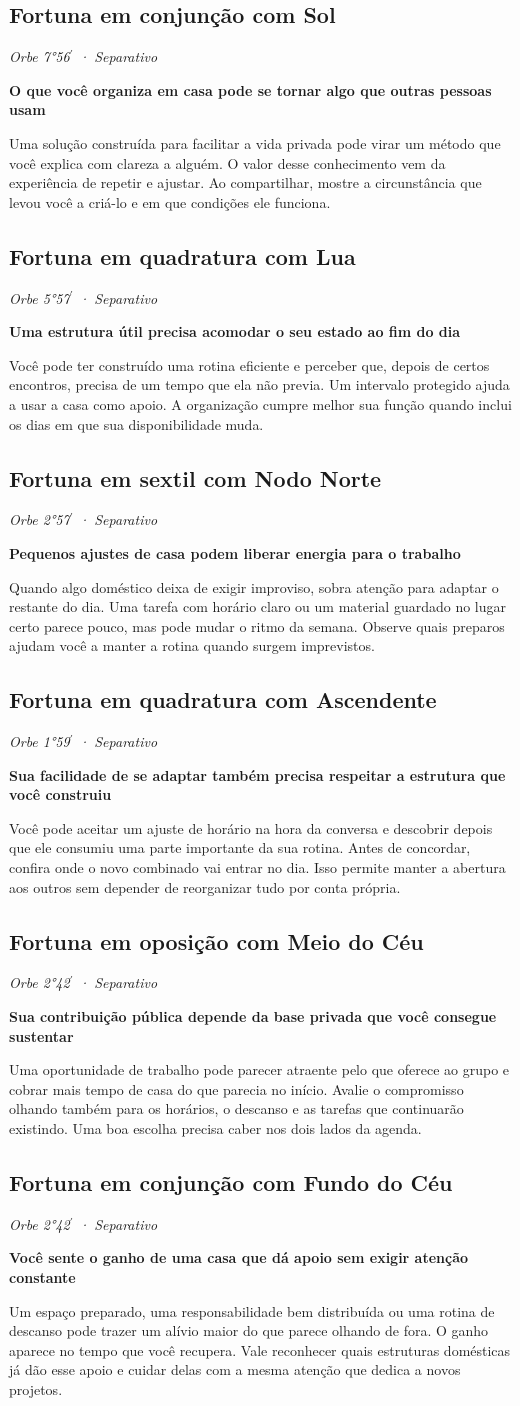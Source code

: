 \documentclass[11pt,a4paper]{article}
\newcommand{\leitura}[3]{\subsection{#1}\textit{#2}\par #3}
\newcommand{\subtituloleitura}[1]{\textbf{#1}\par\nopagebreak[4]}
\begin{document}
\leitura{Fortuna em conjunção com Sol}{Orbe 7°56\ensuremath{^{\prime}} · Separativo}{
\subtituloleitura{O que você organiza em casa pode se tornar algo que outras pessoas usam}
Uma solução construída para facilitar a vida privada pode virar um método que você explica com clareza a alguém. O valor desse conhecimento vem da experiência de repetir e ajustar. Ao compartilhar, mostre a circunstância que levou você a criá-lo e em que condições ele funciona.
}

\leitura{Fortuna em quadratura com Lua}{Orbe 5°57\ensuremath{^{\prime}} · Separativo}{
\subtituloleitura{Uma estrutura útil precisa acomodar o seu estado ao fim do dia}
Você pode ter construído uma rotina eficiente e perceber que, depois de certos encontros, precisa de um tempo que ela não previa. Um intervalo protegido ajuda a usar a casa como apoio. A organização cumpre melhor sua função quando inclui os dias em que sua disponibilidade muda.
}

\leitura{Fortuna em sextil com Nodo Norte}{Orbe 2°57\ensuremath{^{\prime}} · Separativo}{
\subtituloleitura{Pequenos ajustes de casa podem liberar energia para o trabalho}
Quando algo doméstico deixa de exigir improviso, sobra atenção para adaptar o restante do dia. Uma tarefa com horário claro ou um material guardado no lugar certo parece pouco, mas pode mudar o ritmo da semana. Observe quais preparos ajudam você a manter a rotina quando surgem imprevistos.
}

\leitura{Fortuna em quadratura com Ascendente}{Orbe 1°59\ensuremath{^{\prime}} · Separativo}{
\subtituloleitura{Sua facilidade de se adaptar também precisa respeitar a estrutura que você construiu}
Você pode aceitar um ajuste de horário na hora da conversa e descobrir depois que ele consumiu uma parte importante da sua rotina. Antes de concordar, confira onde o novo combinado vai entrar no dia. Isso permite manter a abertura aos outros sem depender de reorganizar tudo por conta própria.
}

\leitura{Fortuna em oposição com Meio do Céu}{Orbe 2°42\ensuremath{^{\prime}} · Separativo}{
\subtituloleitura{Sua contribuição pública depende da base privada que você consegue sustentar}
Uma oportunidade de trabalho pode parecer atraente pelo que oferece ao grupo e cobrar mais tempo de casa do que parecia no início. Avalie o compromisso olhando também para os horários, o descanso e as tarefas que continuarão existindo. Uma boa escolha precisa caber nos dois lados da agenda.
}

\leitura{Fortuna em conjunção com Fundo do Céu}{Orbe 2°42\ensuremath{^{\prime}} · Separativo}{
\subtituloleitura{Você sente o ganho de uma casa que dá apoio sem exigir atenção constante}
Um espaço preparado, uma responsabilidade bem distribuída ou uma rotina de descanso pode trazer um alívio maior do que parece olhando de fora. O ganho aparece no tempo que você recupera. Vale reconhecer quais estruturas domésticas já dão esse apoio e cuidar delas com a mesma atenção que dedica a novos projetos.
}
\end{document}
